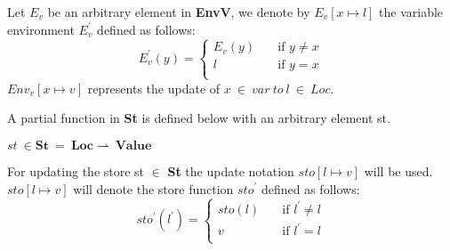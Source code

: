 Let \begin{math}E_v\end{math} be an arbitrary element in \textbf{EnvV}, we denote by \begin{math} E_v[x \mapsto l] \end{math} the variable environment \begin{math}E_v^{'} \end{math} defined as follows:
\[ E^{'}_v(y) =	
\begin{cases}
E_v(y) & \quad \text{if } y \not= x\\
l & \quad \text{if } y = x\\	
\end{cases}	
\]
\begin{math}Env_v[x \mapsto v] \end{math} represents the update of \begin{math} x \ \in \ var \ to \ l \ \in \ Loc.\end{math} 

A partial function in \textbf{St} is defined below with an arbitrary element st.

\begin{math}		
st \ \in \boldsymbol{St} \ = \ \boldsymbol{Loc} \rightharpoonup \ \boldsymbol{Value}		
\end{math}

For updating the store st \begin{math} \in \end{math} \textbf{St} the update notation \begin{math} sto[l \mapsto v] \end{math} will be used. \begin{math} sto[l \mapsto v] \end{math} will denote the store function \begin{math}sto^{'} \end{math} defined as follows:
\[ sto^{'}(l^{'}) =	
\begin{cases}	
sto(l) & \quad \text{if } l^{'} \not= l\\	
v & \quad \text{if } l^{'} = l\\	
\end{cases}	
\]

